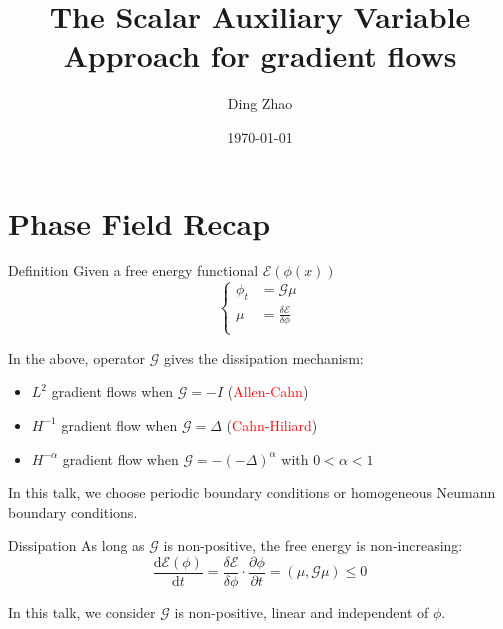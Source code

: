 \documentclass[9pt]{beamer}
\begin{document}
    \title{The Scalar Auxiliary Variable Approach for gradient flows}
    \author{Ding Zhao}
    \date{\today}
    \frame{\titlepage}

\section{Phase Field Recap}

\begin{frame}{Definition}
Given a free energy functional $\mathcal E(\phi(x))$
$$\left\{
\begin{aligned}
\phi_t &= \mathcal{G} \mu \\
\mu &= \frac{\delta \mathcal E}{\delta \phi} \\
\end{aligned}
\right.$$

In the above,  operator $\mathcal G$ gives the dissipation mechanism:
\begin{itemize}
\item{$L^2$ gradient flows when $\mathcal G = -I$} (\textcolor{red}{Allen-Cahn})
\item{$H^{-1}$ gradient flow when $\mathcal G = \Delta$} (\textcolor{red}{Cahn-Hiliard})
 \item{$H^{-\alpha}$ gradient flow when $\mathcal G = -(-\Delta)^{\alpha}$ with $0 < \alpha < 1$}
\end{itemize}
In this talk, we choose periodic boundary conditions or  homogeneous Neumann boundary conditions. %
\end{frame}

\begin{frame}{Dissipation}
As long as $\mathcal G$ is non-positive, the free energy is non-increasing:
$$\frac{\mathrm{d} \mathcal{E}(\phi)}{\mathrm{d} t}=\frac{\delta \mathcal{E}}{\delta \phi} \cdot \frac{\partial \phi}{\partial t}=(\mu, \mathcal{G} \mu) \leq 0$$

In this talk, we consider $\mathcal G$ is non-positive, linear and independent of $\phi$.
\end{frame}
\end{document}
